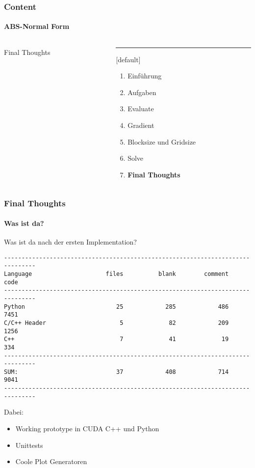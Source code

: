 \begin{frame}
	\frametitle{Content}
	\framesubtitle{ABS-Normal Form}
	\begin{columns}[T] %
		\begin{column}{.48\textwidth}
			
			\begin{center}
				{\Huge Final Thoughts}
			\end{center}
			
		\end{column}%
		\hfill%
		\begin{column}{.48\textwidth}
			\color{blue}\rule{\linewidth}{4pt}
			
			\begin{enumerate}
				\item Einführung
				\item Aufgaben
				\item Evaluate
				\item Gradient
				\item Blocksize und Gridsize
				\item Solve
				\item \textbf{Final Thoughts}
			\end{enumerate}
		\end{column}%
	\end{columns}
\end{frame}
\begin{frame}[fragile]
	\frametitle{Final Thoughts}
	\framesubtitle{Was ist da?}
Was ist da nach der ersten Implementation?
\pause
\begin{lstlisting}
-------------------------------------------------------------------------------
Language                     files          blank        comment           code
-------------------------------------------------------------------------------
Python                          25            285            486           7451
C/C++ Header                     5             82            209           1256
C++                              7             41             19            334
-------------------------------------------------------------------------------
SUM:                            37            408            714           9041
-------------------------------------------------------------------------------
\end{lstlisting}
\pause
Dabei:
\begin{itemize}
	\item Working prototype in CUDA C++ und Python
	\item Unittests
	\item Coole Plot Generatoren
\end{itemize}
\end{frame}
